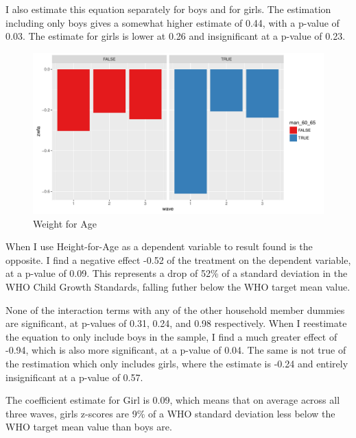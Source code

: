 \documentclass[a4paper,british]{article}\usepackage[]{graphicx}\usepackage[]{color}
\makeatletter
\def\maxwidth{ %
  \ifdim\Gin@nat@width>\linewidth
    \linewidth
  \else
    \Gin@nat@width
  \fi
}
\newenvironment{knitrout}{}{} %
\makeatother
\begin{document}
I also estimate this equation separately for boys and for girls. The
estimation including only boys gives a somewhat higher estimate of
0.44, with a p-value of 0.03. The estimate for girls is lower at 0.26
and insignificant at a p-value of 0.23.

\begin{figure}[H]
\caption{Weight for Age}

\label{fig:waz-bars}

\begin{knitrout}
\color{fgcolor}
\includegraphics[width=\maxwidth]{figures/latex-waz1-1} 

\end{knitrout}
\end{figure}

When I use Height-for-Age as a dependent variable to result found
is the opposite. I find a negative effect -0.52 of the treatment on
the dependent variable, at a p-value of 0.09. This represents a drop
of 52\% of a standard deviation in the WHO Child Growth Standards,
falling futher below the WHO target mean value.

None of the interaction terms with any of the other household member
dummies are significant, at p-values of 0.31, 0.24, and 0.98 respectively.
When I reestimate the equation to only include boys in the sample,
I find a much greater effect of -0.94, which is also more significant,
at a p-value of 0.04. The same is not true of the restimation which
only includes girls, where the estimate is -0.24 and entirely insignificant
at a p-value of 0.57.

The coefficient estimate for Girl is 0.09, which means that on average
across all three waves, girls z-scores are 9\% of a WHO standard deviation
less below the WHO target mean value than boys are.
\end{document}
